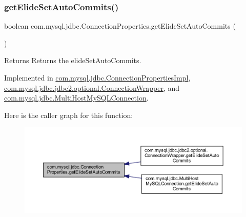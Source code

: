 \subsubsection{\texorpdfstring{get\+Elide\+Set\+Auto\+Commits()}{getElideSetAutoCommits()}}
{\footnotesize\ttfamily boolean com.\+mysql.\+jdbc.\+Connection\+Properties.\+get\+Elide\+Set\+Auto\+Commits (\begin{DoxyParamCaption}{ }\end{DoxyParamCaption})}

\begin{DoxyReturn}{Returns}
Returns the elide\+Set\+Auto\+Commits. 
\end{DoxyReturn}


Implemented in \mbox{\hyperlink{classcom_1_1mysql_1_1jdbc_1_1_connection_properties_impl_af85a865c522e1a674ab78c2bbfa2d738}{com.\+mysql.\+jdbc.\+Connection\+Properties\+Impl}}, \mbox{\hyperlink{classcom_1_1mysql_1_1jdbc_1_1jdbc2_1_1optional_1_1_connection_wrapper_a764dc2884e41a1c01956ef80e7ed578a}{com.\+mysql.\+jdbc.\+jdbc2.\+optional.\+Connection\+Wrapper}}, and \mbox{\hyperlink{classcom_1_1mysql_1_1jdbc_1_1_multi_host_my_s_q_l_connection_a78b0a4ac4834370a985b18fd5f0d35a2}{com.\+mysql.\+jdbc.\+Multi\+Host\+My\+S\+Q\+L\+Connection}}.

Here is the caller graph for this function\+:\nopagebreak
\begin{figure}[H]
\begin{center}
\leavevmode
\includegraphics[width=350pt]{interfacecom_1_1mysql_1_1jdbc_1_1_connection_properties_ad0c5071cd7d12eadb159a6b0cf8066c3_icgraph}
\end{center}
\end{figure}
\mbox{\label{interfacecom_1_1mysql_1_1jdbc_1_1_connection_properties_ac13c3eab30955ea55dcf84333aeb730f}} 
